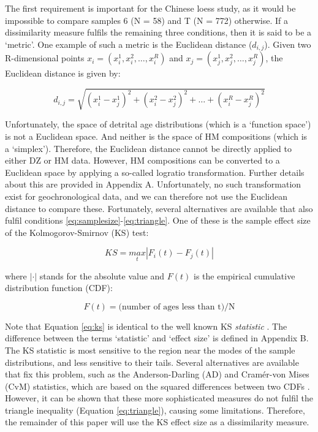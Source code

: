\documentclass[authoryear,preprint,review,12pt]{elsarticle}
\begin{document}
The first requirement is important for the Chinese loess study, as it
would be impossible to compare samples 6 (N = 58) and T (N = 772)
otherwise.  If a dissimilarity measure fulfils the remaining three
conditions, then it is said to be a `metric'. One example of such a
metric is the Euclidean distance ($d_{i,j}$). Given two R-dimensional
points $x_i = (x_i^1,x_i^2,\ldots,x_i^R)$ and $x_j =
(x_j^1,x_j^2,\ldots,x_j^R)$, the Euclidean distance is given by:

\begin{equation}
d_{i,j} = \sqrt{(x_i^1-x_j^1)^2+(x_i^2-x_j^2)^2+\ldots+(x_i^R-x_j^R)^2} 
\label{eq:euclidean}
\end{equation}

Unfortunately, the space of detrital age distributions (which is a
`function space') is not a Euclidean space. And neither is the space
of HM compositions (which is a `simplex').  Therefore, the Euclidean
distance cannot be directly applied to either DZ or HM data.  However,
HM compositions can be converted to a Euclidean space by applying a
so-called logratio transformation. Further details about this are
provided in Appendix A. Unfortunately, no such transformation exist
for geochronological data, and we can therefore not use the Euclidean
distance to compare these.  Fortunately, several alternatives are
available that also fulfil conditions
\ref{eq:samplesize}-\ref{eq:triangle}. One of these is the sample
effect size of the Kolmogorov-Smirnov (KS) test:

\begin{equation}
KS = \underset{t}{max}|F_i(t)-F_j(t)|
\label{eq:ks}
\end{equation}

where $|\cdot|$ stands for the absolute value and $F(t)$ is the
empirical cumulative distribution function (CDF):

\begin{equation}
F(t) = \mbox{(number of ages less than t)/N}
\label{eq:cdf}
\end{equation}

Note that Equation \ref{eq:ks} is identical to the well known KS
\emph{statistic} \citep{feller1948}. The difference between the terms
`statistic' and `effect size' is defined in Appendix B.  The KS
statistic is most sensitive to the region near the modes of the sample
distributions, and less sensitive to their tails.  Several
alternatives are available that fix this problem, such as the
Anderson-Darling (AD) and Cram\'{e}r-von Mises (CvM) statistics, which
are based on the squared differences between two CDFs
\citep{anderson1954, anderson1962}. However, it can be shown that
these more sophisticated measures do not fulfil the triangle
inequality (Equation \ref{eq:triangle}), causing some limitations.
Therefore, the remainder of this paper will use the KS effect size as
a dissimilarity measure.
\end{document}
